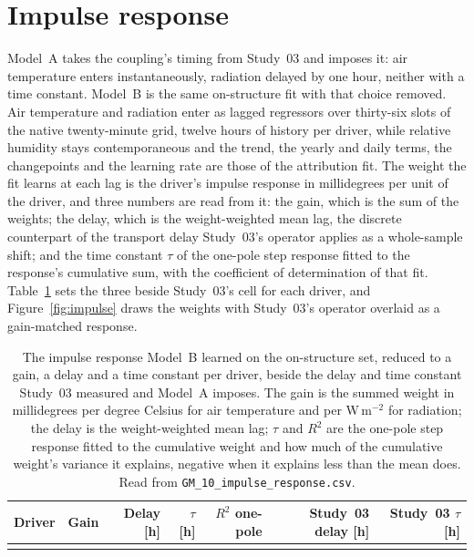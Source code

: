 \documentclass[11pt,a4paper]{article}
\begin{document}
\section{Impulse response}
\label{sec:impulse}

Model~A takes the coupling's timing from Study~03 and imposes it: air
temperature enters instantaneously, radiation delayed by one hour, neither with
a time constant. Model~B is the same on-structure fit with that choice removed.
Air temperature and radiation enter as lagged regressors over thirty-six slots
of the native twenty-minute grid, twelve hours of history per driver, while
relative humidity stays contemporaneous and the trend, the yearly and daily
terms, the changepoints and the learning rate are those of the attribution fit.
The weight the fit learns at each lag is the driver's impulse response in
millidegrees per unit of the driver, and three numbers are read from it: the
gain, which is the sum of the weights; the delay, which is the weight-weighted
mean lag, the discrete counterpart of the transport delay Study~03's operator
applies as a whole-sample shift; and the time constant $\tau$ of the one-pole
step response fitted to the response's cumulative sum, with the coefficient of
determination of that fit. Table~\ref{tab:impulse} sets the three beside
Study~03's cell for each driver, and Figure~\ref{fig:impulse} draws the
weights with Study~03's operator overlaid as a gain-matched response.

\begin{table}[H]
\centering
\caption{The impulse response Model~B learned on the on-structure set,
reduced to a gain, a delay and a time constant per driver, beside the delay and
time constant Study~03 measured and Model~A imposes. The gain is the summed
weight in millidegrees per degree Celsius for air temperature and per
W\,m$^{-2}$ for radiation; the delay is the weight-weighted mean lag; $\tau$
and $R^2$ are the one-pole step response fitted to the cumulative weight and
how much of the cumulative weight's variance it explains, negative when it
explains less than the mean does. Read from
\texttt{GM\_10\_impulse\_response.csv}.}
\label{tab:impulse}
{\small\setlength{\tabcolsep}{4.5pt}
\begin{tabular}{lrrrrrr}
\toprule
Driver & Gain & Delay [h] & $\tau$ [h] & $R^2$ one-pole & Study~03 delay [h] & Study~03 $\tau$ [h] \\
\midrule
\\
\bottomrule
\end{tabular}}
\end{table}
\end{document}

